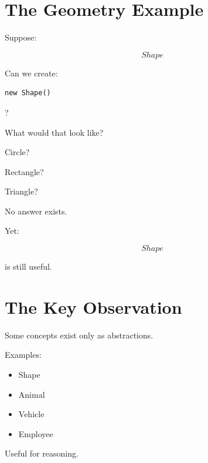 \documentclass[11pt,a4paper]{book}
\begin{document}

\section{The Geometry Example}

Suppose:

\[
Shape
\]


Can we create:

\begin{verbatim}
new Shape()
\end{verbatim}

?


What would that look like?

Circle?

Rectangle?

Triangle?


No answer exists.


Yet:

\[
Shape
\]

is still useful.


\section{The Key Observation}

Some concepts exist only as abstractions.


Examples:

\begin{itemize}
\item Shape
\item Animal
\item Vehicle
\item Employee
\end{itemize}


Useful for reasoning.
\end{document}

